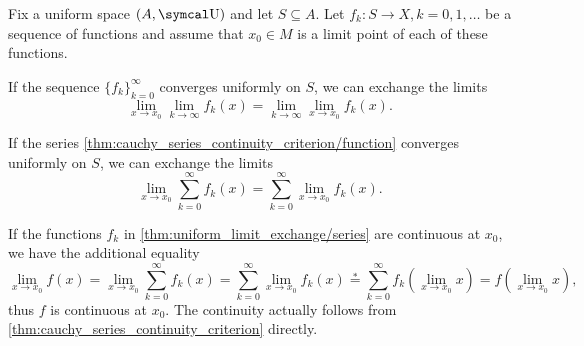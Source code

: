 \begin{theorem}\label{thm:uniform_limit_exchange}\cite[]{Фихтенгольц1968/2}
  Fix a uniform space \( (A, \CU) \) and let \( S \subseteq A \). Let \( f_k: S \to X, k = 0, 1, \ldots \) be a sequence of functions and assume that \( x_0 \in M \) is a limit point of each of these functions.

  \begin{thmenum}
     If the sequence \( \{ f_k \}_{k=0}^\infty \) converges uniformly on \( S \), we can exchange the limits
    \begin{equation*}
      \lim_{x \to x_0} \lim_{k \to \infty} f_k(x)
      =
      \lim_{k \to \infty} \lim_{x \to x_0} f_k(x).
    \end{equation*}

     If the series \cref{thm:cauchy_series_continuity_criterion/function} converges uniformly on \( S \), we can exchange the limits
    \begin{equation*}
      \lim_{x \to x_0} \sum_{k=0}^\infty f_k(x)
      =
      \sum_{k=0}^\infty \lim_{x \to x_0} f_k(x).
    \end{equation*}
  \end{thmenum}
\end{theorem}

\begin{remark}\label{remark:thm:uniform_limit_exchange_continuity}
  If the functions \( f_k \) in \cref{thm:uniform_limit_exchange/series} are continuous at \( x_0 \), we have the additional equality
  \begin{equation}\label{thm:uniform_limit_exchange/continuous_equality}
    \lim_{x \to x_0} f(x)
    =
    \lim_{x \to x_0} \sum_{k=0}^\infty f_k(x)
    =
    \sum_{k=0}^\infty \lim_{x \to x_0} f_k(x)
    \overset * =
    \sum_{k=0}^\infty f_k\left(\lim_{x \to x_0} x \right)
    =
    f\left(\lim_{x \to x_0} x \right),
  \end{equation}
  thus \( f \) is continuous at \( x_0 \). The continuity actually follows from \cref{thm:cauchy_series_continuity_criterion} directly.
\end{remark}

